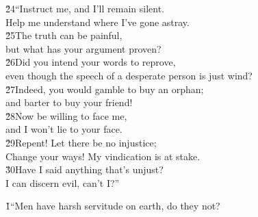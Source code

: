 \begin{poetry}
\poeml \v{24}``Instruct me, and I'll remain silent. \\
\poemll    Help me understand where I've gone astray. \\
\poeml \v{25}The truth can be painful, \\
\poemll    but what has your argument proven? \\
\poeml \v{26}Did you intend your words to reprove, \\
\poemll    even though the speech of a desperate person is just wind? \\
\poeml \v{27}Indeed, you would gamble to buy an orphan; \\
\poemll    and barter to buy your friend! \\
\poeml \v{28}Now be willing to face me, \\
\poemll    and I won't lie to your face. \\
\poeml \v{29}Repent! Let there be no injustice; \\
\poemll    Change your ways! My vindication is at stake. \\
\poeml \v{30}Have I said anything that's unjust? \\
\poemll    I can discern evil, can't I?''
\end{poetry}

\v{1}``Men have harsh servitude on earth, do they not?

